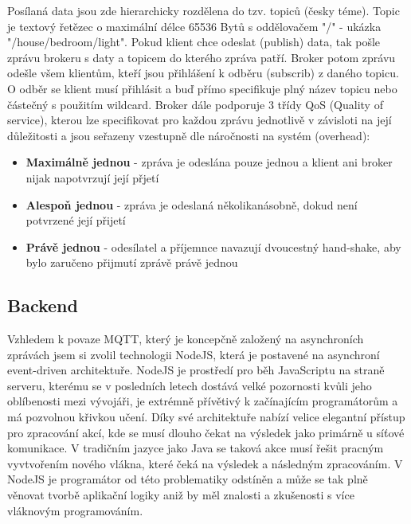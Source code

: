 \documentclass[thesis=B,czech]{FITthesis}[2019/12/23]
\begin{document}
Posílaná data jsou zde hierarchicky rozdělena do tzv. topiců (česky téme). Topic je textový řetězec o maximální délce 65536 Bytů s oddělovačem "/" - ukázka "/house/bedroom/light". Pokud klient chce odeslat (publish) data, tak pošle zprávu brokeru s daty a topicem do kterého zpráva patří. Broker potom zprávu odešle všem klientům, kteří jsou přihlášení k odběru (subscrib) z daného topicu. O odběr se klient musí přihlásit a buď přímo specifikuje plný název topicu nebo částečný s použitím wildcard. Broker dále podporuje 3 třídy QoS (Quality of service), kterou lze specifikovat pro každou zprávu jednotlivě v závisloti na její důležitosti a jsou seřazeny vzestupně dle náročnosti na systém (overhead):
\begin{itemize}
    \item \textbf{Maximálně jednou} - zpráva je odeslána pouze jednou a klient ani broker nijak napotvrzují její přjetí
    \item \textbf{Alespoň jednou} - zpráva je odeslaná několikanásobně, dokud není potvrzené její přijetí
    \item \textbf{Právě jednou} - odesílatel a příjemnce navazují dvoucestný hand-shake, aby bylo zaručeno přijmutí zprávě právě jednou
\end{itemize}


\subsection{Backend}    %
Vzhledem k povaze MQTT, který je koncepčně založený na asynchroních zprávách jsem si zvolil technologii NodeJS, která je postavené na asynchroní event-driven architektuře. NodeJS je prostředí pro běh JavaScriptu na straně serveru, kterému se v posledních letech dostává velké pozornosti kvůli jeho oblíbenosti mezi vývojáři, je extrémně přívětivý k začínajícím programátorům a má pozvolnou křivkou učení. Díky své architektuře nabízí velice elegantní přístup pro zpracování akcí, kde se musí dlouho čekat na výsledek jako primárně u síťové komunikace. V tradičním jazyce jako Java se taková akce musí řešit pracným vyvtvořením nového vlákna, které čeká na výsledek a následným zpracováním. V NodeJS je programátor od této problematiky odstíněn a může se tak plně věnovat tvorbě aplikační logiky aniž by měl znalosti a zkušenosti s více vláknovým programováním.
 
\end{document}
